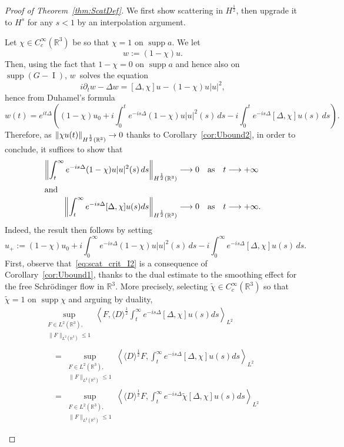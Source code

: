 \documentclass[10pt]{amsart}
\theoremstyle{definition}\newtheorem{defi}[theo]{Definition}\newtheorem{rema}[theo]{Remark}\newtheorem{exam}[theo]{Example}\newtheorem{exem}[theo]{Example}\newtheorem{nota}[theo]{Notation}
\newcommand*\R{\mathbb{R}}
\DeclareMathOperator{\I}{I}
\DeclareMathOperator{\supp}{supp}
\renewcommand*{\to}{\mathchoice{\longrightarrow}{\rightarrow}{\rightarrow}{\rightarrow}}
\begin{document}
\begin{proof}[Proof of Theorem~\ref{thm:ScatDef}]
We first show scattering in $H^{\frac 12}$, then upgrade it to $H^s$ for any $s<1$ by an interpolation argument.

Let $\chi \in C^\infty_c(\R^3)$ be so that $\chi = 1$ on $\supp a$. We let
\[
w := (1-\chi)u.
\]
Then, using the fact that $1-\chi = 0$ on $\supp a$ and hence also on $\supp (G-\I )$, $w$~solves the equation
\[
i\partial_t w - \Delta w = [\Delta, \chi] u - (1-\chi)u|u|^{2},
\]
hence from Duhamel's formula
\[
w(t) = e^{it \Delta}\left((1-\chi) u_0 + i \int_0^t e^{-is\Delta} (1-\chi)u|u|^{2}(s) \, ds - i \int_0^t e^{-is\Delta}[\Delta, \chi] u(s) \, ds \right).
\]
Therefore, as $\| \chi u(t) \|_{H^{\frac 12}(\R^3)} \to 0$ thanks to Corollary~\ref{cor:Ubound2}, in order to conclude, it suffices to show that
\begin{align}
\left\| \int_t^\infty e^{-is\Delta} (1-\chi)u|u|^{2}(s) \, ds \right\|_{H^{\frac 12}(\R^3)} &\to 0 \quad\text{as}\quad t\to +\infty\label{eq:scat_crit_I1}
\\
\intertext{and}
\left\| \int_t^\infty e^{-is\Delta}[\Delta, \chi] u(s) ds \right\|_{H^{\frac 12}(\R^3)} &\to 0 \quad\text{as}\quad t\to +\infty.\label{eq:scat_crit_I2}
\end{align}
Indeed, the result then follows by setting
\[
u_+ := (1-\chi) u_0 + i \int_0^\infty e^{-is\Delta} (1-\chi)u|u|^{2}(s) \, ds - i \int_0^\infty e^{-is\Delta}[\Delta, \chi] u(s) \, ds.
\]
First, observe that~\eqref{eq:scat_crit_I2} is a consequence of Corollary~\ref{cor:Ubound1}, thanks to the dual estimate to the smoothing effect for the free Schr{\"o}dinger flow in $\R^3$. More precisely, selecting $\widetilde \chi \in C^\infty_c(\R^3)$ so that $\widetilde \chi = 1$ on $\supp \chi$ and arguing by duality,
\begin{multline*}
\sup_{\substack{F \in L^2(\R^3), \\ \| F \|_{L^2(\R^3)} \leq 1}} \left\langle F, \langle D \rangle^{\frac 12} \int_t^\infty e^{-is\Delta}[\Delta, \chi] u(s) ds \right\rangle_{L^2} \\
\begin{aligned}
& = \sup_{\substack{F \in L^2(\R^3), \\ \| F \|_{L^2(\R^3)} \leq 1}} \left\langle \langle D \rangle^{\frac 12} F, \int_t^\infty e^{-is\Delta}[\Delta, \chi] u(s) ds \right\rangle_{L^2} \\
&= \sup_{\substack{F \in L^2(\R^3), \\ \| F \|_{L^2(\R^3)} \leq 1}} \left\langle \langle D \rangle^{\frac 12} F, \int_t^\infty e^{-is\Delta}\widetilde \chi [\Delta, \chi] u(s) ds \right\rangle_{L^2} \\

\end{aligned}
\end{multline*}
\end{proof}
\end{document}
